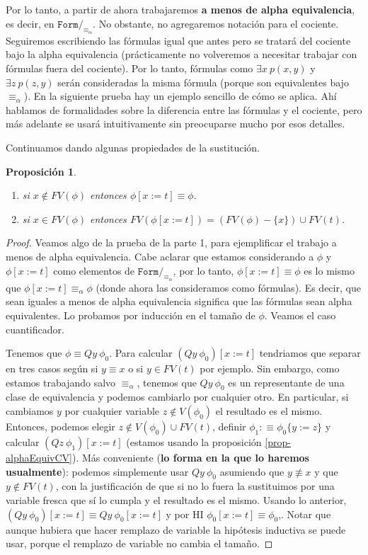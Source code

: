 \documentclass[a4paper, 12pt]{report}
\newtheorem{prop}[teorema]{Proposición}
\theoremstyle{definition}
\begin{document}
Por lo tanto, a partir de ahora trabajaremos \textbf{a menos de alpha equivalencia}, es decir, en $\mathtt{Form}/_{\equiv_\alpha}$. No obstante, no agregaremos notación para el cociente. Seguiremos escribiendo las fórmulas igual que antes pero se tratará del cociente bajo la alpha equivalencia (prácticamente no volveremos a necesitar trabajar con fórmulas fuera del cociente). Por lo tanto, fórmulas como $\exists x ~p(x,y)$ y $\exists z~p(z,y)$ serán consideradas la misma fórmula (porque son equivalentes bajo $\equiv_\alpha$). En la siguiente prueba hay un ejemplo sencillo de cómo se aplica. Ahí hablamos de formalidades sobre la diferencia entre las fórmulas y el cociente, pero más adelante se usará intuitivamente sin preocuparse mucho por esos detalles.

Continuamos dando algunas propiedades de la sustitución.
\begin{prop}
	\begin{enumerate}
		\item si $x\not\in FV(\phi)$ entonces $\phi[x:=t]\equiv\phi$.
		\item si $x\in FV(\phi)$ entonces $FV(\phi[x:=t])=(FV(\phi)-\{x\})\cup FV(t)$.
	\end{enumerate}
\end{prop}
\begin{proof}
	Veamos algo de la prueba de la parte 1, para ejemplificar el trabajo a menos de alpha equivalencia. Cabe aclarar que estamos considerando a $\phi$ y $\phi[x:=t]$ como elementos de $\mathtt{Form}/_{\equiv_\alpha}$, por lo tanto, $\phi[x:=t]\equiv\phi$ es lo mismo que $\phi[x:=t]\equiv_\alpha\phi$ (donde ahora las consideramos como fórmulas). Es decir, que sean iguales a menos de alpha equivalencia significa que las fórmulas sean alpha equivalentes. Lo probamos por inducción en el tamaño de $\phi$. Veamos el caso cuantificador.
	
	Tenemos que $\phi\equiv Qy~\phi_0$. Para calcular $(Qy~\phi_0)[x:=t]$ tendriamos que separar en tres casos según si $y\equiv x$ o si $y\in FV(t)$ por ejemplo. Sin embargo, como estamos trabajando salvo $\equiv_\alpha$, tenemos que $Qy~\phi_0$ es un representante de una clase de equivalencia y podemos cambiarlo por cualquier otro. En particular, si cambiamos $y$ por cualquier variable $z\not\in V(\phi_0)$ el resultado es el mismo. Entonces, podemos elegir $z\not\in V(\phi_0)\cup FV(t)$, definir $\phi_1:\equiv\phi_0\{y:=z\}$ y calcular $(Qz~\phi_1)[x:=t]$ (estamos usando la proposición \ref{prop-alphaEquivCV}). Más conveniente (\textbf{lo forma en la que lo haremos usualmente}): podemos simplemente usar $Qy~\phi_0$ asumiendo que $y\not\equiv x$ y que $y\not\in FV(t)$, con la justificación de que si no lo fuera la sustituimos por una variable fresca que sí lo cumpla y el resultado es el mismo. Usando lo anterior, $(Qy~\phi_0)[x:=t]\equiv Qy~\phi_0[x:=t]$ y por HI  $\phi_0[x:=t]\equiv\phi_0$,.  Notar que aunque hubiera que hacer remplazo de variable la hipótesis inductiva se puede usar, porque el remplazo de variable no cambia el tamaño.
\end{proof}
\end{document}
